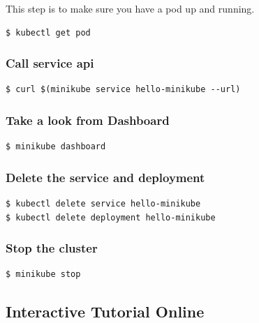 This step is to make sure you have a pod up and running.

\begin{verbatim}
$ kubectl get pod
\end{verbatim}

\subsubsection{Call service api}\label{call-service-api}

\begin{verbatim}
$ curl $(minikube service hello-minikube --url)
\end{verbatim}

\subsubsection{Take a look from
Dashboard}\label{take-a-look-from-dashboard}

\begin{verbatim}
$ minikube dashboard
\end{verbatim}

\subsubsection{Delete the service and
deployment}\label{delete-the-service-and-deployment}

\begin{verbatim}
$ kubectl delete service hello-minikube
$ kubectl delete deployment hello-minikube
\end{verbatim}

\subsubsection{Stop the cluster}\label{stop-the-cluster}

\begin{verbatim}
$ minikube stop
\end{verbatim}

\subsection{Interactive Tutorial
Online}\label{interactive-tutorial-online}

